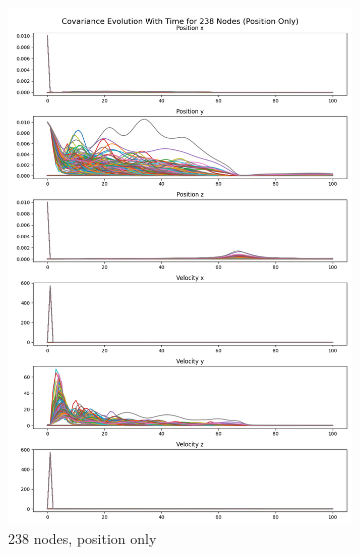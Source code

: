 \documentclass[subscriptcorrection,upint,varvw,barcolor=Goldenrod3,mathalfa=cal=euler,balance,hyphenate,french,pdf-a, nofoot]{asmejour} %
\begin{document}
\begin{figure}[ht]
\begin{subfigure}[b]{0.32\linewidth}
        \includegraphics[width=\linewidth]{CLOTH REPORT PICS/covariance 238 p.jpg}
        \caption{238 nodes, position only}
        \label{fig:covariance-238-pos}
    \end{subfigure}
    \hfill %
    \begin{subfigure}[b]{0.32\linewidth}

\end{subfigure}
\end{figure}
\end{document}
